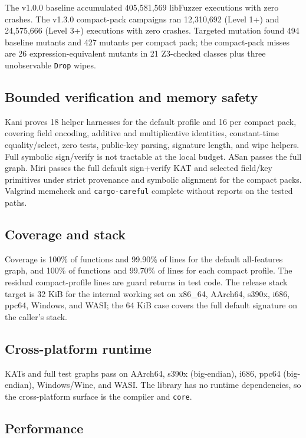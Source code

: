 \documentclass[11pt,a4paper]{article}
\begin{document}
The v1.0.0 baseline accumulated 405,581,569 libFuzzer executions with zero
crashes. The v1.3.0 compact-pack campaigns ran 12,310,692 (Level 1+) and
24,575,666 (Level 3+) executions with zero crashes. Targeted mutation found
494 baseline mutants and 427 mutants per compact pack; the compact-pack misses
are 26 expression-equivalent mutants in 21 Z3-checked classes plus three
unobservable \texttt{Drop} wipes.

\subsection{Bounded verification and memory safety}

Kani proves 18 helper harnesses for the default profile and 16 per compact
pack, covering field encoding, additive and multiplicative identities,
constant-time equality/select, zero tests, public-key parsing, signature
length, and wipe helpers. Full symbolic sign/verify is not tractable at the
local budget. ASan passes the full graph. Miri passes the full default
sign+verify KAT and selected field/key primitives under strict provenance and
symbolic alignment for the compact packs. Valgrind memcheck and
\texttt{cargo-careful} complete without reports on the tested paths.

\subsection{Coverage and stack}

Coverage is 100\% of functions and 99.90\% of lines for the default
all-features graph, and 100\% of functions and 99.70\% of lines for each
compact profile. The residual compact-profile lines are guard returns in test
code. The release stack target is 32 KiB for the internal working set on
x86\_64, AArch64, s390x, i686, ppc64, Windows, and WASI; the 64 KiB case covers
the full default signature on the caller's stack.

\subsection{Cross-platform runtime}

KATs and full test graphs pass on AArch64, s390x (big-endian), i686, ppc64
(big-endian), Windows/Wine, and WASI. The library has no runtime dependencies,
so the cross-platform surface is the compiler and \texttt{core}.

\subsection{Performance}
\end{document}
